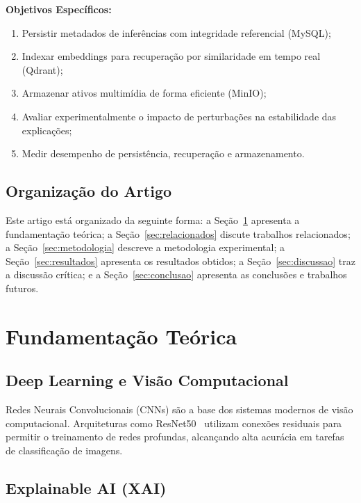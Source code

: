 \documentclass[12pt,a4paper,twoside]{article}
\begin{document}
\textbf{Objetivos Específicos:}
\begin{enumerate}
    \item Persistir metadados de inferências com integridade referencial (MySQL);
    \item Indexar embeddings para recuperação por similaridade em tempo real (Qdrant);
    \item Armazenar ativos multimídia de forma eficiente (MinIO);
    \item Avaliar experimentalmente o impacto de perturbações na estabilidade das explicações;
    \item Medir desempenho de persistência, recuperação e armazenamento.
\end{enumerate}

\subsection{Organização do Artigo}

Este artigo está organizado da seguinte forma: a Seção~\ref{sec:fundamentacao} apresenta a fundamentação teórica; a Seção~\ref{sec:relacionados} discute trabalhos relacionados; a Seção~\ref{sec:metodologia} descreve a metodologia experimental; a Seção~\ref{sec:resultados} apresenta os resultados obtidos; a Seção~\ref{sec:discussao} traz a discussão crítica; e a Seção~\ref{sec:conclusao} apresenta as conclusões e trabalhos futuros.

\section{Fundamentação Teórica}
\label{sec:fundamentacao}

\subsection{Deep Learning e Visão Computacional}

Redes Neurais Convolucionais (CNNs) são a base dos sistemas modernos de visão computacional. Arquiteturas como ResNet50~\cite{he2016deep} utilizam conexões residuais para permitir o treinamento de redes profundas, alcançando alta acurácia em tarefas de classificação de imagens.

\subsection{Explainable AI (XAI)}
\end{document}

